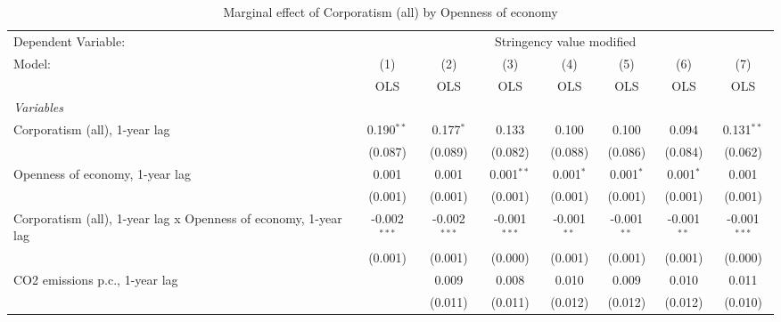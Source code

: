 
\begin{table}[htbp]
   \caption{Marginal effect of Corporatism (all) by Openness of economy}
   \centering
   \begin{tabular}{lccccccc}
      \toprule
      Dependent Variable: & \multicolumn{7}{c}{Stringency value modified}\\
      Model:                                                          & (1)            & (2)            & (3)            & (4)           & (5)           & (6)           & (7)\\  
                                                                      &  OLS           & OLS            & OLS            & OLS           & OLS           & OLS           & OLS\\  
      \midrule
      \emph{Variables}\\
      Corporatism (all), 1-year lag                                   & 0.190$^{**}$   & 0.177$^{*}$    & 0.133          & 0.100         & 0.100         & 0.094         & 0.131$^{**}$\\   
                                                                      & (0.087)        & (0.089)        & (0.082)        & (0.088)       & (0.086)       & (0.084)       & (0.062)\\   
      Openness of economy, 1-year lag                                 & 0.001          & 0.001          & 0.001$^{**}$   & 0.001$^{*}$   & 0.001$^{*}$   & 0.001$^{*}$   & 0.001\\   
                                                                      & (0.001)        & (0.001)        & (0.001)        & (0.001)       & (0.001)       & (0.001)       & (0.001)\\   
      Corporatism (all), 1-year lag x Openness of economy, 1-year lag & -0.002$^{***}$ & -0.002$^{***}$ & -0.001$^{***}$ & -0.001$^{**}$ & -0.001$^{**}$ & -0.001$^{**}$ & -0.001$^{***}$\\   
                                                                      & (0.001)        & (0.001)        & (0.000)        & (0.001)       & (0.001)       & (0.001)       & (0.000)\\   
      CO2 emissions p.c., 1-year lag                                  &                & 0.009          & 0.008          & 0.010         & 0.009         & 0.010         & 0.011\\   
                                                                      &                & (0.011)        & (0.011)        & (0.012)       & (0.012)       & (0.012)       & (0.010)\\   

\end{tabular}
\end{table}

